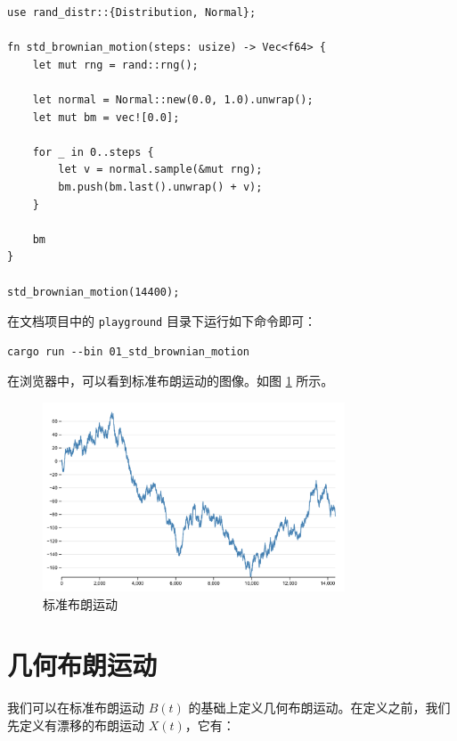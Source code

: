 \documentclass[utf8,a4paper,nofonts,9pt]{ctexbook}
\begin{document}
\begin{lstlisting}
use rand_distr::{Distribution, Normal};

fn std_brownian_motion(steps: usize) -> Vec<f64> {
    let mut rng = rand::rng();

    let normal = Normal::new(0.0, 1.0).unwrap();
    let mut bm = vec![0.0];

    for _ in 0..steps {
        let v = normal.sample(&mut rng);
        bm.push(bm.last().unwrap() + v);
    }

    bm
}

std_brownian_motion(14400);
\end{lstlisting}

在文档项目中的 \verb|playground| 目录下运行如下命令即可：

\begin{lstlisting}
cargo run --bin 01_std_brownian_motion
\end{lstlisting}

在浏览器中，可以看到标准布朗运动的图像。如图 \ref{fig:stdBrownianMotion} 所示。

\begin{figure}[h]
    \centering
    \includegraphics[width=0.8\textwidth]{src/static/00_std_brownian_motion.png}
    \caption{标准布朗运动}
    \label{fig:stdBrownianMotion}
\end{figure}



\section[几何布朗运动]{几何布朗运动\protect\footnotemark}

我们可以在标准布朗运动 $B(t)$ 的基础上定义几何布朗运动。在定义之前，我们先定义有漂移的布朗运动 $X(t)$，它有：
\end{document}
